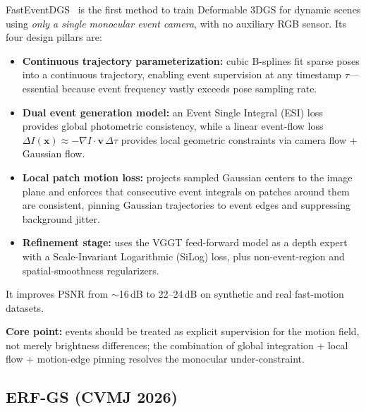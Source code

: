 FastEventDGS~\cite{dai2026fasteventdgs} is the first method to train Deformable 3DGS for dynamic scenes using \emph{only a single monocular event camera}, with no auxiliary RGB sensor. Its four design pillars are:
\begin{itemize}
    \item \textbf{Continuous trajectory parameterization:} cubic B-splines fit sparse poses into a continuous trajectory, enabling event supervision at any timestamp $\tau$---essential because event frequency vastly exceeds pose sampling rate.
    \item \textbf{Dual event generation model:} an Event Single Integral (ESI) loss provides global photometric consistency, while a linear event-flow loss $\Delta I(\mathbf{x})\approx-\nabla I\cdot\mathbf{v}\,\Delta\tau$ provides local geometric constraints via camera flow + Gaussian flow.
    \item \textbf{Local patch motion loss:} projects sampled Gaussian centers to the image plane and enforces that consecutive event integrals on patches around them are consistent, pinning Gaussian trajectories to event edges and suppressing background jitter.
    \item \textbf{Refinement stage:} uses the VGGT feed-forward model as a depth expert with a Scale-Invariant Logarithmic (SiLog) loss, plus non-event-region and spatial-smoothness regularizers.
\end{itemize}
It improves PSNR from $\sim$16\,dB to 22--24\,dB on synthetic and real fast-motion datasets.

\textbf{Core point:} events should be treated as explicit supervision for the motion field, not merely brightness differences; the combination of global integration + local flow + motion-edge pinning resolves the monocular under-constraint.

\subsection{ERF-GS (CVMJ 2026)}
\label{sec:dynamic:erfgs}

